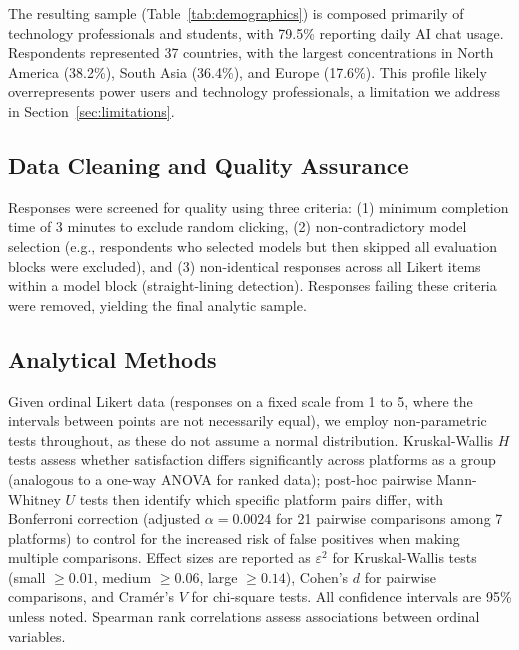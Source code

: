 \documentclass[10pt,twocolumn]{article}
\begin{document}
The resulting sample (Table~\ref{tab:demographics}) is composed primarily of technology professionals and students, with 79.5\% reporting daily AI chat usage. Respondents represented 37 countries, with the largest concentrations in North America (38.2\%), South Asia (36.4\%), and Europe (17.6\%). This profile likely overrepresents power users and technology professionals, a limitation we address in Section~\ref{sec:limitations}.

\subsection{Data Cleaning and Quality Assurance}

Responses were screened for quality using three criteria: (1) minimum completion time of 3 minutes to exclude random clicking, (2) non-contradictory model selection (e.g., respondents who selected models but then skipped all evaluation blocks were excluded), and (3) non-identical responses across all Likert items within a model block (straight-lining detection). Responses failing these criteria were removed, yielding the final analytic sample.

\subsection{Analytical Methods}

Given ordinal Likert data (responses on a fixed scale from 1 to 5, where the intervals between points are not necessarily equal), we employ non-parametric tests throughout, as these do not assume a normal distribution. Kruskal-Wallis $H$ tests assess whether satisfaction differs significantly across platforms as a group (analogous to a one-way ANOVA for ranked data); post-hoc pairwise Mann-Whitney $U$ tests then identify which specific platform pairs differ, with Bonferroni correction (adjusted $\alpha = 0.0024$ for 21 pairwise comparisons among 7 platforms) to control for the increased risk of false positives when making multiple comparisons. Effect sizes are reported as $\varepsilon^2$ for Kruskal-Wallis tests (small $\geq 0.01$, medium $\geq 0.06$, large $\geq 0.14$), Cohen's $d$ for pairwise comparisons, and Cram\'{e}r's $V$ for chi-square tests. All confidence intervals are 95\% unless noted. Spearman rank correlations assess associations between ordinal variables.
\end{document}
